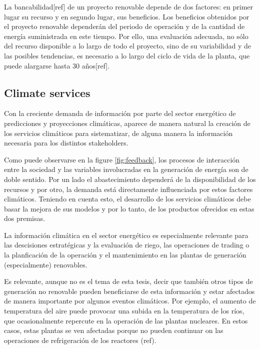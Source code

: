 La bancabilidad[ref] de un proyecto renovable depende de dos factores: en primer lugar su recurso y en segundo lugar, sus beneficios. Los beneficios obtenidos por el proyecto renovable dependerán del periodo de operación y de la cantidad de energía suministrada en este tiempo. Por ello, una evaluación adecuada, no sólo del recurso disponible a lo largo de todo el proyecto, sino de su variabilidad y de las posibles tendencias, es necesario a lo largo del ciclo de vida de la planta, que puede alargarse hasta 30 años[ref].

\subsection{Climate services}

Con la creciente demanda de información por parte del sector energético de predicciones y proyecciones climáticas, aparece de manera natural la creación de los servicios climáticos para sistematizar, de alguna manera la información necesaria para los distintos stakeholders. 

Como puede observarse en la figure \ref{fig:feedback}, los procesos de interacción entre la sociedad y las variables involucradas en la generación de energía son de doble sentido. Por un lado el abastecimiento dependerá de la disponibilidad de los recursos y por otro, la demanda está directamente influenciada por estos factores climáticos. Teniendo en cuenta esto, el desarrollo de los servicios climáticos debe basar la mejora de sus modelos y por lo tanto, de los productos ofrecidos en estas dos premisas.

La información climática en el sector energético es especialmente relevante para las descisiones estratégicas y la evaluación de riego, las operaciones de trading o la planficación de la operación y el mantenimiento en las plantas de generación (especialmente) renovables.

Es relevante, aunque no es el tema de esta tesis, decir que también otros tipos de generación no renovable pueden beneficiarse de esta información y estar afectados de manera importante por algunos eventos climáticos. Por ejemplo, el aumento de temperatura del aire puede provocar una subida en la temperatura de los ríos, que ocasionalmente repercute en la operación de las plantas nucleares. En estos casos, estas plantas se ven afectadas porque no pueden continuar on las operaciones de refrigeración de los reactores (ref). 

